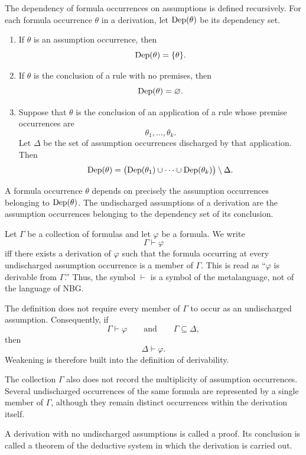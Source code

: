 The dependency of formula occurrences on assumptions is defined recursively. For each formula occurrence \(\theta\) in a derivation, let \(\operatorname{Dep}(\theta)\) be its dependency set.

\begin{enumerate}
    \item If \(\theta\) is an assumption occurrence, then
    \[
    \operatorname{Dep}(\theta)=\{\theta\}.
    \]

    \item If \(\theta\) is the conclusion of a rule with no premises, then
    \[
    \operatorname{Dep}(\theta)=\varnothing.
    \]

    \item Suppose that \(\theta\) is the conclusion of an application of a rule whose premise occurrences are
    \[
    \theta_1,\ldots,\theta_k.
    \]
    Let \(\Delta\) be the set of assumption occurrences discharged by that application. Then
    \[
    \operatorname{Dep}(\theta)
    =
    \bigl(
    \operatorname{Dep}(\theta_1)\cup\cdots\cup\operatorname{Dep}(\theta_k)
    \bigr)
    \setminus\Delta.
    \]
\end{enumerate}

A formula occurrence \(\theta\) depends on precisely the assumption occurrences belonging to \(\operatorname{Dep}(\theta)\). The undischarged assumptions of a derivation are the assumption occurrences belonging to the dependency set of its conclusion.

Let \(\Gamma\) be a collection of formulas and let \(\varphi\) be a formula. We write
\[
\Gamma\vdash\varphi
\]
iff there exists a derivation of \(\varphi\) such that the formula occurring at every undischarged assumption occurrence is a member of \(\Gamma\). This is read as ``\(\varphi\) is derivable from \(\Gamma\).'' Thus, the symbol \(\vdash\) is a symbol of the metalanguage, not of the language of NBG.

The definition does not require every member of \(\Gamma\) to occur as an undischarged assumption. Consequently, if
\[
\Gamma\vdash\varphi
\qquad\text{and}\qquad
\Gamma\subseteq\Delta,
\]
then
\[
\Delta\vdash\varphi.
\]
Weakening is therefore built into the definition of derivability.

The collection \(\Gamma\) also does not record the multiplicity of assumption occurrences. Several undischarged occurrences of the same formula are represented by a single member of \(\Gamma\), although they remain distinct occurrences within the derivation itself.

A derivation with no undischarged assumptions is called a proof. Its conclusion is called a theorem of the deductive system in which the derivation is carried out.

